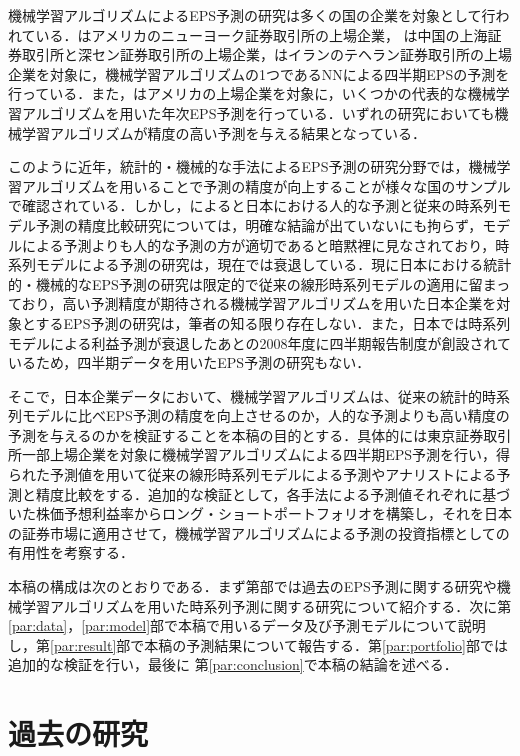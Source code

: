 \documentclass[a4paper，12pt]{jsarticle}
\begin{document}
機械学習アルゴリズムによるEPS予測の研究は多くの国の企業を対象として行われている．\cite{zhang2004neural}はアメリカのニューヨーク証券取引所の上場企業，\cite*{cao2009forecasting} は中国の上海証券取引所と深セン証券取引所の上場企業，\cite{etemadi2015earnings}はイランのテヘラン証券取引所の上場企業を対象に，機械学習アルゴリズムの1つであるNNによる四半期EPSの予測を行っている．また，\cite*{cao2020fundamental}はアメリカの上場企業を対象に，いくつかの代表的な機械学習アルゴリズムを用いた年次EPS予測を行っている．いずれの研究においても機械学習アルゴリズムが精度の高い予測を与える結果となっている．

このように近年，統計的・機械的な手法によるEPS予測の研究分野では，機械学習アルゴリズムを用いることで予測の精度が向上することが様々な国のサンプルで確認されている．しかし，\cite{ota2006}によると日本における人的な予測と従来の時系列モデル予測の精度比較研究については，明確な結論が出ていないにも拘らず，モデルによる予測よりも人的な予測の方が適切であると暗黙裡に見なされており，時系列モデルによる予測の研究は，現在では衰退している．現に日本における統計的・機械的なEPS予測の研究は限定的で従来の線形時系列モデルの適用に留まっており，高い予測精度が期待される機械学習アルゴリズムを用いた日本企業を対象とするEPS予測の研究は，筆者の知る限り存在しない．また，日本では時系列モデルによる利益予測が衰退したあとの2008年度に四半期報告制度が創設されているため，四半期データを用いたEPS予測の研究もない．

そこで，日本企業データにおいて、機械学習アルゴリズムは、従来の統計的時系列モデルに比べEPS予測の精度を向上させるのか，人的な予測よりも高い精度の予測を与えるのかを検証することを本稿の目的とする．具体的には東京証券取引所一部上場企業を対象に機械学習アルゴリズムによる四半期EPS予測を行い，得られた予測値を用いて従来の線形時系列モデルによる予測やアナリストによる予測と精度比較をする．追加的な検証として，各手法による予測値それぞれに基づいた株価予想利益率からロング・ショートポートフォリオを構築し，それを日本の証券市場に適用させて，機械学習アルゴリズムによる予測の投資指標としての有用性を考察する．

本稿の構成は次のとおりである．まず第\ref{par:litrev}部では過去のEPS予測に関する研究や機械学習アルゴリズムを用いた時系列予測に関する研究について紹介する．次に第\ref{par:data}，\ref{par:model}部で本稿で用いるデータ及び予測モデルについて説明し，第\ref{par:result}部で本稿の予測結果について報告する．第\ref{par:portfolio}部では追加的な検証を行い，最後に 第\ref{par:conclusion}で本稿の結論を述べる．

\part{過去の研究} \label{par:litrev}
\end{document}
